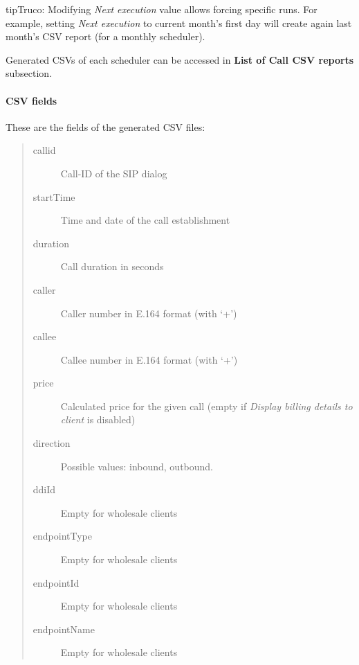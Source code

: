 \documentclass[letterpaper,10pt,spanish]{sphinxmanual}
\begin{document}
\begin{notice}{tip}{Truco:}
Modifying \emph{Next execution} value allows forcing specific runs. For example, setting \emph{Next execution} to
current month's first day will create again last month's CSV report (for a monthly scheduler).
\end{notice}

Generated CSVs of each scheduler can be accessed in \textbf{List of Call CSV reports} subsection.


\paragraph{CSV fields}
\label{administration_portal/client/wholesale/calls/call_csv_schedulers:csv-fields}
These are the fields of the generated CSV files:
\begin{quote}
\begin{description}
\item[{callid}] \leavevmode
Call-ID of the SIP dialog

\item[{startTime}] \leavevmode
Time and date of the call establishment

\item[{duration}] \leavevmode
Call duration in seconds

\item[{caller}] \leavevmode
Caller number in E.164 format (with `+')

\item[{callee}] \leavevmode
Callee number in E.164 format (with `+')

\item[{price}] \leavevmode
Calculated price for the given call (empty if \emph{Display billing details to client} is disabled)

\item[{direction}] \leavevmode
Possible values: inbound, outbound.

\item[{ddiId}] \leavevmode
Empty for wholesale clients

\item[{endpointType}] \leavevmode
Empty for wholesale clients

\item[{endpointId}] \leavevmode
Empty for wholesale clients

\item[{endpointName}] \leavevmode
Empty for wholesale clients

\end{description}
\end{quote}
\end{document}

